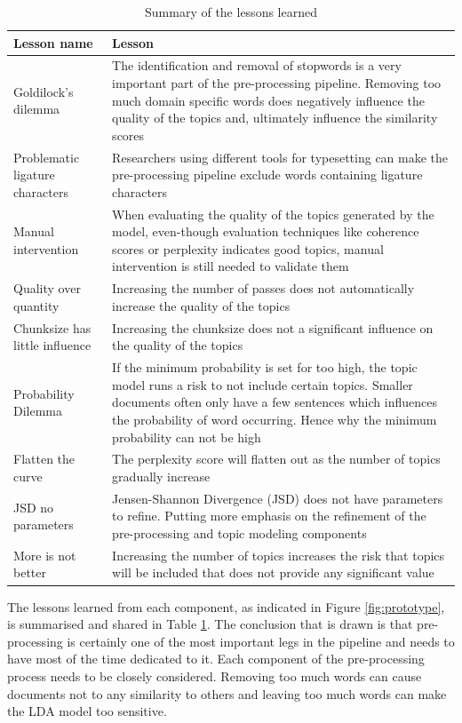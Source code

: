 \begin{table}[]
\begin{tabularx}{\textwidth}{|l|X|}
\hline
\textbf{Lesson name} & \textbf{Lesson} \\ \hline
Goldilock's dilemma & The identification and removal of stopwords is a very important part of the pre-processing pipeline. Removing too much domain specific words does negatively influence the quality of the topics and, ultimately influence the similarity scores \\ \hline
Problematic ligature characters & Researchers using different tools for typesetting can make the pre-processing pipeline exclude words containing ligature characters \\ \hline
Manual intervention & When evaluating the quality of the topics generated by the model, even-though evaluation techniques like coherence scores or perplexity indicates good topics, manual intervention is still needed to validate them \\ \hline
Quality over quantity & Increasing the number of passes does not automatically increase the quality of the topics \\ \hline
Chunksize has little influence & Increasing the chunksize does not a significant influence on the quality of the topics \\ \hline
Probability Dilemma & If the minimum probability is set for too high, the topic model runs a risk to not include certain topics. Smaller documents often only have a few sentences which influences the probability of word occurring. Hence why the minimum probability can not be high \\ \hline
Flatten the curve & The perplexity score will flatten out as the number of topics gradually increase \\ \hline
JSD no parameters & Jensen-Shannon Divergence (JSD) does not have parameters to refine. Putting more emphasis on the refinement of the pre-processing and topic modeling components \\ \hline
More is not better & Increasing the number of topics increases the risk that topics will be included that does not provide any significant value \\ \hline
\end{tabularx}
\caption{Summary of the lessons learned}
\label{tab:lessons}
\end{table}

The lessons learned from each component, as indicated in Figure \ref{fig:prototype}, is summarised and shared in Table \ref{tab:lessons}. The conclusion that is drawn is that pre-processing is certainly one of the most important legs in the pipeline and needs to have most of the time dedicated to it. Each component of the pre-processing process needs to be closely considered. Removing too much words can cause documents not to any similarity to others and leaving too much words can make the LDA model too sensitive.

